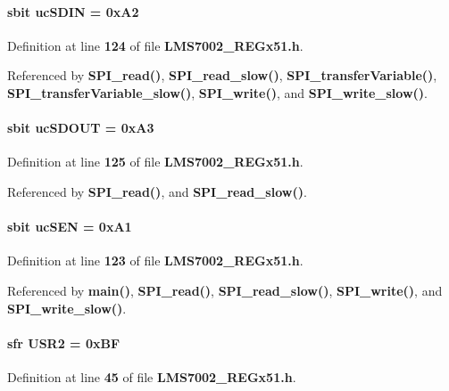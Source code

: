 \paragraph[{uc\+S\+D\+IN}]{\setlength{\rightskip}{0pt plus 5cm}sbit uc\+S\+D\+IN = 0x\+A2}\label{LMS7002__REGx51_8h_adce301035fee185d0e0886aa20c1e89a}


Definition at line {\bf 124} of file {\bf L\+M\+S7002\+\_\+\+R\+E\+Gx51.\+h}.



Referenced by {\bf S\+P\+I\+\_\+read()}, {\bf S\+P\+I\+\_\+read\+\_\+slow()}, {\bf S\+P\+I\+\_\+transfer\+Variable()}, {\bf S\+P\+I\+\_\+transfer\+Variable\+\_\+slow()}, {\bf S\+P\+I\+\_\+write()}, and {\bf S\+P\+I\+\_\+write\+\_\+slow()}.

\paragraph[{uc\+S\+D\+O\+UT}]{\setlength{\rightskip}{0pt plus 5cm}sbit uc\+S\+D\+O\+UT = 0x\+A3}\label{LMS7002__REGx51_8h_a273ccdea133b294769df6cb0993bfd86}


Definition at line {\bf 125} of file {\bf L\+M\+S7002\+\_\+\+R\+E\+Gx51.\+h}.



Referenced by {\bf S\+P\+I\+\_\+read()}, and {\bf S\+P\+I\+\_\+read\+\_\+slow()}.

\paragraph[{uc\+S\+EN}]{\setlength{\rightskip}{0pt plus 5cm}sbit uc\+S\+EN = 0x\+A1}\label{LMS7002__REGx51_8h_abe03377ac0b14fcf3dae6320a2dd9fdf}


Definition at line {\bf 123} of file {\bf L\+M\+S7002\+\_\+\+R\+E\+Gx51.\+h}.



Referenced by {\bf main()}, {\bf S\+P\+I\+\_\+read()}, {\bf S\+P\+I\+\_\+read\+\_\+slow()}, {\bf S\+P\+I\+\_\+write()}, and {\bf S\+P\+I\+\_\+write\+\_\+slow()}.

\paragraph[{U\+S\+R2}]{\setlength{\rightskip}{0pt plus 5cm}sfr U\+S\+R2 = 0x\+BF}\label{LMS7002__REGx51_8h_a7ad745bc477e79673326df39ed77099e}


Definition at line {\bf 45} of file {\bf L\+M\+S7002\+\_\+\+R\+E\+Gx51.\+h}.


